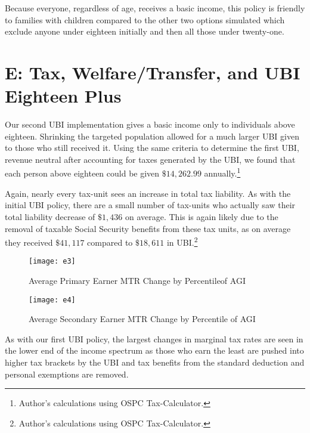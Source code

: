 \documentclass{article}
\newcommand{\ospc}{\footnote{Author’s calculations using OSPC Tax-Calculator.}}
\begin{document}
Because everyone, regardless of age, receives a basic income, this policy is friendly to families with children compared to the other two options simulated which exclude anyone under eighteen initially and then all those under twenty-one.

\section{E: Tax, Welfare/Transfer, and UBI Eighteen Plus}
Our second UBI implementation gives a basic income only to individuals above eighteen. Shrinking the targeted population allowed for a much larger UBI given to those who still received it. Using the same criteria to determine the first UBI, revenue neutral after accounting for taxes generated by the UBI, we found that each person above eighteen could be given $\$14,262.99$ annually.\ospc

Again, nearly every tax-unit sees an increase in total tax liability. As with the initial UBI policy, there are a small number of tax-units who actually saw their total liability decrease of $\$1,436$ on average. This is again likely due to the removal of taxable Social Security benefits from these tax units, as on average they received $\$41,117$ compared to $\$18,611$ in UBI.\ospc

\begin{figure}[H]
\centering
\caption{Average Primary Earner MTR Change by Percentileof AGI}
\texttt{[image: e3]}
\end{figure}

\begin{figure}[H]
\centering
\caption{Average Secondary Earner MTR Change by Percentile of AGI}
\texttt{[image: e4]}
\end{figure}

As with our first UBI policy, the largest changes in marginal tax rates are seen in the lower end of the income spectrum as those who earn the least are pushed into higher tax brackets by the UBI and tax benefits from the standard deduction and personal exemptions are removed.

\begin{table}[H]
\caption{Effects of Tax Reform, Welfare Programs, and UBI by Percentile of AGI}
\begin{center}
\begin{adjustbox}{max width=\textwidth}

\end{adjustbox}
\end{center}
\end{table}
\end{document}
